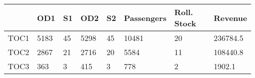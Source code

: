 \begin{tabular}{llllllll}
& OD1 & S1 & OD2 & S2 & Passengers & Roll. Stock & Revenue \\ 
\hline 
TOC1 & 5183 & 45 & 5298 & 45 & 10481 & 20 & 236784.5 \\ 
TOC2 & 2867 & 21 & 2716 & 20 & 5584 & 11 & 108440.8 \\ 
TOC3 & 363 & 3 & 415 & 3 & 778 & 2 & 1902.1 \\ 
\hline 
\end{tabular}